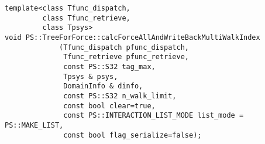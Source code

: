 \label{sec:module_standard_treeforforce_calcforceallandwritebackmultiwalkindex}

\begin{screen}
\begin{verbatim}
template<class Tfunc_dispatch,
         class Tfunc_retrieve,
         class Tpsys>
void PS::TreeForForce::calcForceAllAndWriteBackMultiWalkIndex
             (Tfunc_dispatch pfunc_dispatch,
              Tfunc_retrieve pfunc_retrieve,
              const PS::S32 tag_max,
              Tpsys & psys,
              DomainInfo & dinfo,
              const PS::S32 n_walk_limit,
              const bool clear=true,
              const PS::INTERACTION_LIST_MODE list_mode = PS::MAKE_LIST,
              const bool flag_serialize=false);
\end{verbatim}
\end{screen}

